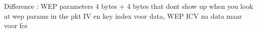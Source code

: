 Difference : WEP parameters 4 bytes + 4 bytes that dont show up when you look at wep params in the pkt
IV en key index voor data, WEP ICV na data maar voor fcs
